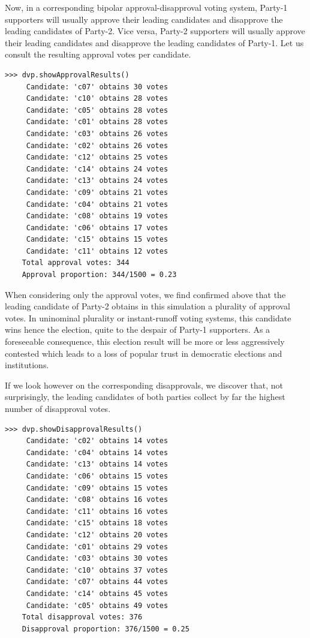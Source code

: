 Now, in a corresponding bipolar approval-disapproval voting system, Party-1 supporters will usually approve their leading candidates and disapprove the leading candidates of Party-2. Vice versa, Party-2 supporters will usually approve their leading candidates and disapprove the leading candidates of Party-1. Let us consult the resulting approval votes per candidate.
\begin{lstlisting}
>>> dvp.showApprovalResults()
     Candidate: 'c07' obtains 30 votes
     Candidate: 'c10' obtains 28 votes
     Candidate: 'c05' obtains 28 votes
     Candidate: 'c01' obtains 28 votes
     Candidate: 'c03' obtains 26 votes
     Candidate: 'c02' obtains 26 votes
     Candidate: 'c12' obtains 25 votes
     Candidate: 'c14' obtains 24 votes
     Candidate: 'c13' obtains 24 votes
     Candidate: 'c09' obtains 21 votes
     Candidate: 'c04' obtains 21 votes
     Candidate: 'c08' obtains 19 votes
     Candidate: 'c06' obtains 17 votes
     Candidate: 'c15' obtains 15 votes
     Candidate: 'c11' obtains 12 votes
    Total approval votes: 344
    Approval proportion: 344/1500 = 0.23
\end{lstlisting}

When considering only the approval votes, we find confirmed above that the leading candidate of Party-2 obtains in this simulation a plurality of approval votes. In uninominal plurality or instant-runoff voting systems, this candidate wins hence the election, quite to the despair of Party-1 supporters. As a foreseeable consequence, this election result will be more or less aggressively contested which leads to a loss of popular trust in democratic elections and institutions.

If we look however on the corresponding disapprovals, we discover that, not surprisingly, the leading candidates of both parties collect by far the highest number of disapproval votes. 
\begin{lstlisting}
>>> dvp.showDisapprovalResults()
     Candidate: 'c02' obtains 14 votes
     Candidate: 'c04' obtains 14 votes
     Candidate: 'c13' obtains 14 votes
     Candidate: 'c06' obtains 15 votes
     Candidate: 'c09' obtains 15 votes
     Candidate: 'c08' obtains 16 votes
     Candidate: 'c11' obtains 16 votes
     Candidate: 'c15' obtains 18 votes
     Candidate: 'c12' obtains 20 votes
     Candidate: 'c01' obtains 29 votes
     Candidate: 'c03' obtains 30 votes
     Candidate: 'c10' obtains 37 votes
     Candidate: 'c07' obtains 44 votes
     Candidate: 'c14' obtains 45 votes
     Candidate: 'c05' obtains 49 votes
    Total disapproval votes: 376
    Disapproval proportion: 376/1500 = 0.25
\end{lstlisting}

